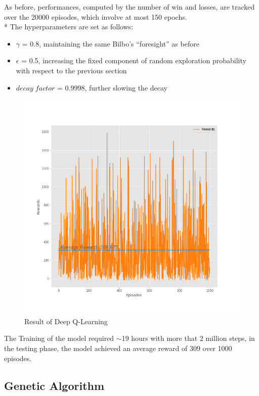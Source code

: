 As before, performances, computed by the number of win and losses, are tracked over the 20000 episodes, which involve at most 150 epochs.\\*
The hyperparameters are set as follows:
\begin{itemize}[noitemsep, topsep=0ex]
  \item $\gamma$ = 0.8, maintaining the same Bilbo's ``foresight'' as before
  \item $\epsilon$ = 0.5, increasing the fixed component of random exploration probability with respect to the previous section
  \item $decay\;factor$ = 0.9998, further slowing the decay
\end{itemize}
\begin{figure}[!h]
	\vspace{-1cm}
	\includegraphics[width=\linewidth]{./figs/deep_test.png}
	\vspace{-1.5cm}
	\caption{Result of Deep Q-Learning}
\end{figure}
The Training of the model required $\sim$19 hours with more that 2 million steps, in the testing phase, the model achieved an average reward of 309 over 1000 episodes.

\subsection{Genetic Algorithm}

